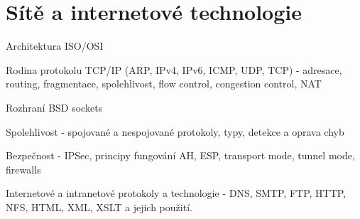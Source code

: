 









\section{Sítě a internetové technologie}
\begin{pozadavky}
\begin{pitemize}
\item Architektura ISO/OSI
\item Rodina protokolu TCP/IP (ARP, IPv4, IPv6, ICMP, UDP, TCP) - adresace, routing, fragmentace, spolehlivost, flow control, congestion control, NAT
\item Rozhraní BSD sockets
\item Spolehlivost - spojované a nespojované protokoly, typy, detekce a oprava chyb
\item Bezpečnost - IPSec, principy fungování AH, ESP, transport mode, tunnel mode, firewalls
\item Internetové a intranetové protokoly a technologie - DNS, SMTP, FTP, HTTP, NFS, HTML, XML, XSLT a jejich použití.
\end{pitemize}
\end{pozadavky}







